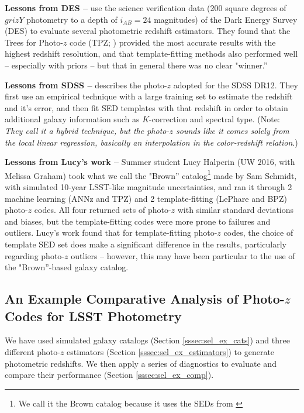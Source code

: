 \documentclass[DM,lsstdraft,toc]{lsstdoc}
\begin{document}
\textbf{Lessons from DES --} \cite{2014MNRAS.445.1482S} use the science verification data (200 square degrees of $grizY$ photometry to a depth of $i_{AB}=24$ magnitudes) of the Dark Energy Survey (DES) to evaluate several photometric redshift estimators. They found that the Trees for Photo-$z$ code (TPZ; \citealt{2013ascl.soft04011C}) provided the most accurate results with the highest redshift resolution, and that template-fitting methods also performed well -- especially with priors -- but that in general there was no clear "winner.''

\textbf{Lessons from SDSS --} \cite{2016MNRAS.460.1371B} describes the photo-$z$ adopted for the SDSS DR12. They first use an empirical technique with a large training set to estimate the redshift and it's error, and then fit SED templates with that redshift in order to obtain additional galaxy information such as $K$-correction and spectral type. (Note: \textit{They call it a hybrid technique, but the photo-$z$ sounds like it comes solely from the local linear regression, basically an interpolation in the color-redshift relation}.)

\textbf{Lessons from Lucy's work --} Summer student Lucy Halperin (UW 2016, with Melissa Graham) took what we call the "Brown'' catalog\footnote{We call it the Brown catalog because it uses the SEDs from \cite{2014ApJS..212...18B}} made by Sam Schmidt, with simulated 10-year LSST-like magnitude uncertainties, and ran it through 2 machine learning (ANNz and TPZ) and 2 template-fitting (LePhare and BPZ) photo-$z$ codes. All four returned sets of photo-$z$ with similar standard deviations and biases, but the template-fitting codes were more prone to failures and outliers. Lucy's work found that for template-fitting photo-$z$ codes, the choice of template SED set does make a significant difference in the results, particularly regarding photo-$z$ outliers -- however, this may have been particular to the use of the "Brown''-based galaxy catalog.


\subsection{An Example Comparative Analysis of Photo-$z$ Codes for LSST Photometry}\label{ssec:sel_ex}

We have used simulated galaxy catalogs (Section \ref{sssec:sel_ex_cats}) and three different photo-$z$ estimators (Section \ref{sssec:sel_ex_estimators}) to generate photometric redshifts. We then apply a series of diagnostics to evaluate and compare their performance (Section \ref{sssec:sel_ex_comp}).
\end{document}
